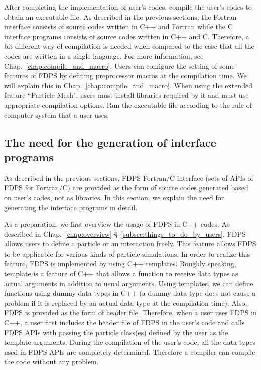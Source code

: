 \begin{enumerate}[leftmargin=*,label={[\arabic*]}]
 After completing the implementation of user's codes, compile the user's codes to obtain an executable file. As described in the previous sections, the Fortran interface consists of source codes written in C++ and Fortran while the C interface programs consists of source codes written in C++ and C. Therefore, a bit different way of compilation is needed when compared to the case that all the codes are written in a single language. For more information, see Chap.~\ref{chap:compile_and_macro}. Users can configure the setting of some features of FDPS by defining preprocessor macros at the compilation time. We will explain this in Chap.~\ref{chap:compile_and_macro}. When using the extended feature ``Particle Mesh", users must install libraries required by it and must use appropriate compilation options.
 Run the executable file according to the rule of computer system that a user uses.
\end{enumerate}

\subsection{The need for the generation of interface programs}
\label{subsec:reasons_for_autogen_ftn_if}
As described in the previous sections, FDPS Fortran/C interface (sets of APIs of FDPS for Fortran/C) are provided as the form of source codes generated based on user's codes, not as libraries. In this section, we explain the need for generating the interface programs in detail.

As a preparation, we first overview the usage of FDPS in C++ codes. As described in Chap.~\ref{chap:overview} \S~\ref{subsec:things_to_do_by_users}, FDPS allows users to define a particle or an interaction freely. This feature allows FDPS to be applicable for various kinds of particle simulations. In order to realize this feature, FDPS is implemented by using C++ templates.  Roughly speaking, template is a feature of C++ that allows a function to receive data types as actual arguments in addition to usual arguments. Using templates, we can define functions using dummy data types in C++ (a dummy data type does not cause a problem if it is replaced by an actual data type at the compilation time). Also, FDPS is provided as the form of header file. Therefore, when a user uses FDPS in C++, a user first includes the header file of FDPS in the user's code and calls FDPS APIs with passing the particle class(es) defined by the user as the template arguments. During the compilation of the user's code, all the data types used in FDPS APIs are completely determined. Therefore a compiler can compile the code without any problem.

